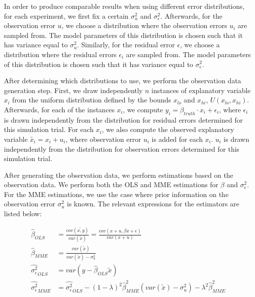 \documentclass{article}
\begin{document}
In order to produce comparable results when using different error distributions, for each experiment, we first fix a certain $\sigma^2_u$ and $\sigma^2_\epsilon$.
Afterwards, for the observation error $u$, we choose a distribution where the observation errors $u_i$ are sampled from.
The model parameters of this distribution is chosen such that it has variance equal to $\sigma_u^2$.
Similarly, for the residual error $\epsilon$, we choose a distribution where the residual errors $\epsilon_i$ are sampled from.
The model parameters of this distribution is chosen such that it has variance equal to $\sigma_\epsilon^2$.

After determining which distributions to use, we perform the observation data generation step. First, we draw independently $n$ instances of explanatory variable $x_i$ from the uniform distribution defined by the bounds $x_{lo}$ and $x_{hi}$, $U(x_{lo}, x_{hi})$.
Afterwards, for each of the instances $x_i$, we compute $y_i = \beta_{truth} \cdot x_i + \epsilon_i$, where $\epsilon_i$ is drawn independently from the distribution for residual errors determined for this simulation trial.
For each $x_i$, we also compute the observed explanatory variable $\tilde{x_i} = x_i + u_i$, where observation error $u_i$ is added for each $x_i$. $u_i$ is drawn independently from the distribution for observation errors determined for this simulation trial.

After generating the observation data, we perform estimations based on the observation data. We perform both the OLS and MME estimations for $\beta$ and $\sigma_\epsilon^2$. For the MME estimations, we use the case where prior information on the observation error $\sigma_u^2$ is known. The relevant expressions for the estimators are listed below:

\begin{equation}
    \begin{split}
        \hat{\beta}_{OLS} &= \frac{cov(\tilde{x, y})}{var(\tilde{x})} = \frac{cov(x+u, \beta x + \epsilon)}{var(x + u)}\\
        \hat{\beta}_{MME} &= \frac{var(\tilde{x})}{var(\tilde{x}) - \sigma^2_u}\\
        \hat{\sigma^2_\epsilon}_{OLS} &= var\left(y - \hat{\beta}_{OLS} \tilde{x}\right)\\
        \hat{\sigma^2_\epsilon}_{MME} &= \hat{\sigma^2_\epsilon}_{OLS} -  (1-\lambda)^2 \hat{\beta}_{MME}^2 (var(\tilde{x}) - \sigma^2_u) - \lambda^2 \hat{\beta}_{MME}^2\\
    \end{split}
\end{equation}
\end{document}
